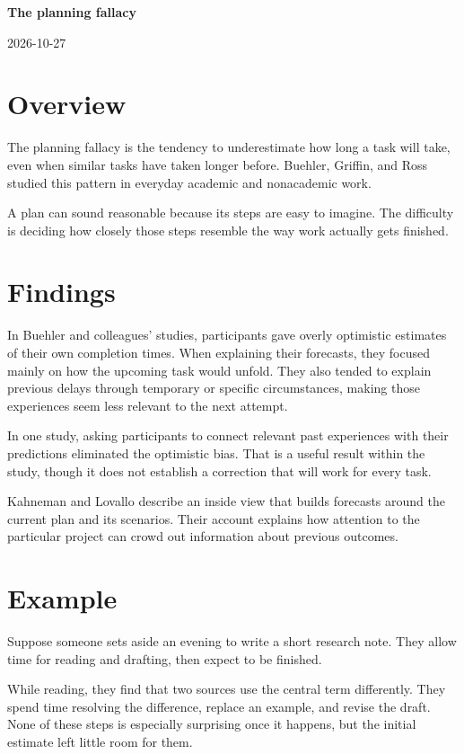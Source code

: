 \documentclass[11pt,a4paper]{article}
\newcommand{\researchtitle}{The planning fallacy}
\newcommand{\researchdate}{2026-10-27}
\begin{document}
{\LARGE\bfseries\researchtitle\par}
\vspace{0.4em}
{\small\researchdate\par}

\section{Overview}

The planning fallacy is the tendency to underestimate how long a task
will take, even when similar tasks have taken longer before.
Buehler, Griffin, and Ross studied this pattern in everyday academic
and nonacademic work. \cite{buehler}

A plan can sound reasonable because its steps are easy to imagine.
The difficulty is deciding how closely those steps resemble the way
work actually gets finished.

\section{Findings}

In Buehler and colleagues' studies, participants gave overly optimistic
estimates of their own completion times. When explaining their forecasts,
they focused mainly on how the upcoming task would unfold. They also
tended to explain previous delays through temporary or specific
circumstances, making those experiences seem less relevant to the
next attempt. \cite{buehler}

In one study, asking participants to connect relevant past experiences
with their predictions eliminated the optimistic bias. That is a useful
result within the study, though it does not establish a correction
that will work for every task. \cite{buehler}

Kahneman and Lovallo describe an inside view that builds forecasts around
the current plan and its scenarios. Their account explains how attention
to the particular project can crowd out information about previous
outcomes. \cite{kahneman}

\section{Example}

Suppose someone sets aside an evening to write a short research note.
They allow time for reading and drafting, then expect to be finished.

While reading, they find that two sources use the central term differently.
They spend time resolving the difference, replace an example, and revise
the draft. None of these steps is especially surprising once it happens,
but the initial estimate left little room for them.
\end{document}
